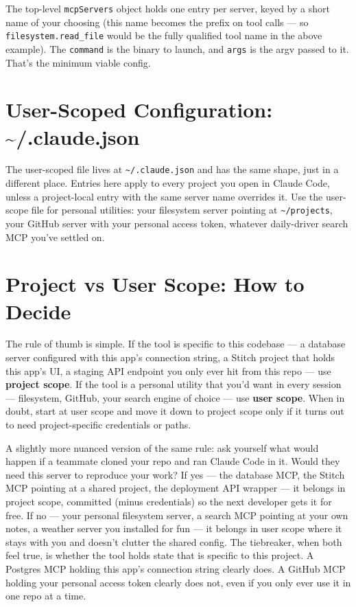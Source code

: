 \documentclass[11pt,letterpaper,openany]{book}
\begin{document}
The top-level \texttt{mcpServers} object holds one entry per server,
keyed by a short name of your choosing (this name becomes the prefix on
tool calls --- so \texttt{filesystem.read\_file} would be the fully
qualified tool name in the above example). The \texttt{command} is the
binary to launch, and \texttt{args} is the argv passed to it. That's the
minimum viable config.

\section{User-Scoped Configuration: \textasciitilde/.claude.json}

The user-scoped file lives at \texttt{\~{}/.claude.json} and has the
same shape, just in a different place. Entries here apply to every
project you open in Claude Code, unless a project-local entry with the
same server name overrides it. Use the user-scope file for personal
utilities: your filesystem server pointing at \texttt{\~{}/projects},
your GitHub server with your personal access token, whatever daily-driver
search MCP you've settled on.

\section{Project vs User Scope: How to Decide}

The rule of thumb is simple. If the tool is specific to this codebase ---
a database server configured with this app's connection string, a Stitch
project that holds this app's UI, a staging API endpoint you only ever
hit from this repo --- use \textbf{project scope}. If the tool is a
personal utility that you'd want in every session --- filesystem,
GitHub, your search engine of choice --- use \textbf{user scope}. When
in doubt, start at user scope and move it down to project scope only if
it turns out to need project-specific credentials or paths.

A slightly more nuanced version of the same rule: ask yourself what
would happen if a teammate cloned your repo and ran Claude Code in
it. Would they need this server to reproduce your work? If yes ---
the database MCP, the Stitch MCP pointing at a shared project, the
deployment API wrapper --- it belongs in project scope, committed
(minus credentials) so the next developer gets it for free. If no
--- your personal filesystem server, a search MCP pointing at your
own notes, a weather server you installed for fun --- it belongs in
user scope where it stays with you and doesn't clutter the shared
config. The tiebreaker, when both feel true, is whether the tool
holds state that is specific to this project. A Postgres MCP
holding this app's connection string clearly does. A GitHub MCP
holding your personal access token clearly does not, even if you
only ever use it in one repo at a time.
\end{document}

